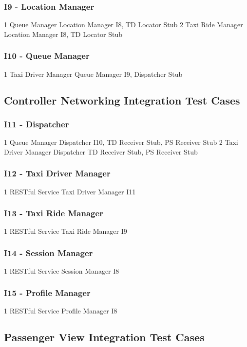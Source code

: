 \subsubsection{I9 - Location Manager}
\testCaseSimpleSimple
	{1}
	{Queue Manager}
	{Location Manager}
	{I8, TD Locator Stub}
\testCaseSimpleSimple
	{2}
	{Taxi Ride Manager}
	{Location Manager}
	{I8, TD Locator Stub}
\subsubsection{I10 - Queue Manager}
\testCaseSimpleSimple
	{1}
	{Taxi Driver Manager}
	{Queue Manager}
	{I9, Dispatcher Stub}

\subsection{Controller Networking Integration Test Cases}
\subsubsection{I11 - Dispatcher}
\testCaseSimpleSimple
	{1}
	{Queue Manager}
	{Dispatcher}
	{I10, TD Receiver Stub, PS Receiver Stub}
\testCaseSimpleSimple
	{2}
	{Taxi Driver Manager}
	{Dispatcher}
	{TD Receiver Stub, PS Receiver Stub}
\subsubsection{I12 - Taxi Driver Manager}
\testCaseSimpleSimple
	{1}
	{RESTful Service}
	{Taxi Driver Manager}
	{I11}
\subsubsection{I13 - Taxi Ride Manager}
\testCaseSimpleSimple
	{1}
	{RESTful Service}
	{Taxi Ride Manager}
	{I9}
\subsubsection{I14 - Session Manager}
\testCaseSimpleSimple
	{1}
	{RESTful Service}
	{Session Manager}
	{I8}
\subsubsection{I15 - Profile Manager}
\testCaseSimpleSimple
	{1}
	{RESTful Service}
	{Profile Manager}
	{I8}
\subsection{Passenger View Integration Test Cases}
